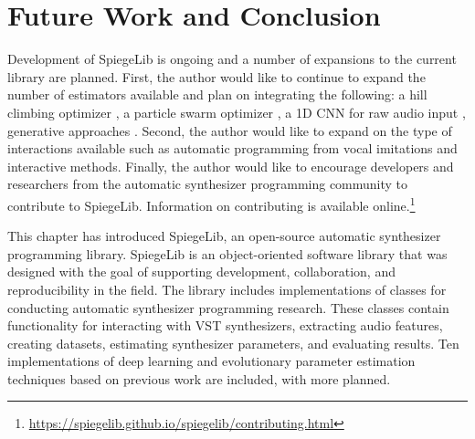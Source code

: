 \section{Future Work and Conclusion}
Development of SpiegeLib is ongoing and a number of expansions to the current library are planned. First, the author would like to continue to expand the number of estimators available and plan on integrating the following: a hill climbing optimizer \cite{yee2018automatic}, a particle swarm optimizer \cite{heise2009automatic}, a 1D CNN for raw audio input \cite{barkan2019inversynth}, generative approaches \cite{esling2020flow, le2021improving}.  Second, the author would like to expand on the type of interactions available such as automatic programming from vocal imitations \cite{mcartwright2014} and interactive methods. 
Finally, the author would like to encourage developers and researchers from the automatic synthesizer programming community to contribute to SpiegeLib. Information on contributing is available online.\footnote{\url{https://spiegelib.github.io/spiegelib/contributing.html}} 

This chapter has introduced SpiegeLib, an open-source automatic synthesizer programming library. SpiegeLib is an object-oriented software library that was designed with the goal of supporting development, collaboration, and reproducibility in the field. The library includes implementations of classes for conducting automatic synthesizer programming research. These classes contain functionality for interacting with VST synthesizers, extracting audio features, creating datasets, estimating synthesizer parameters, and evaluating results. Ten implementations of deep learning and evolutionary parameter estimation techniques based on previous work are included, with more planned.